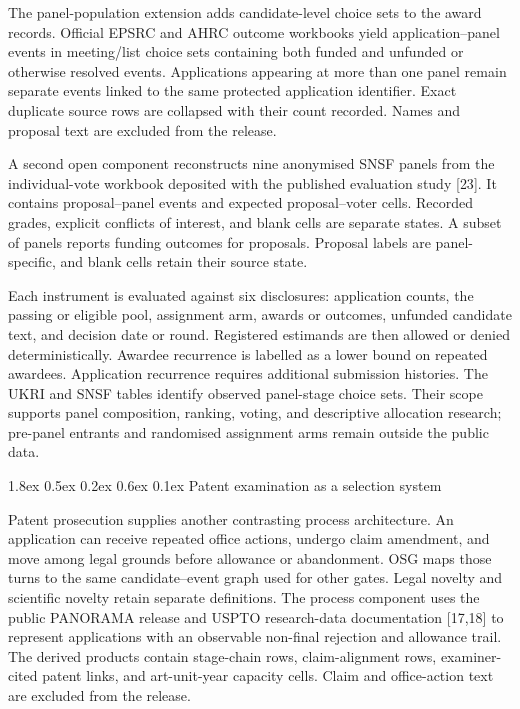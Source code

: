 \documentclass[
  10pt,
]{article}
\makeatletter
\renewcommand\subsubsection{\@startsection{subsubsection}{3}{\z@}%
  {1.8ex \@plus 0.5ex \@minus 0.2ex}%
  {0.6ex \@plus 0.1ex}%
  {\normalfont\normalsize\sffamily\bfseries\color{OSGInk}}}
\makeatother
\begin{document}
The panel-population extension adds candidate-level choice sets to the
award records. Official EPSRC and AHRC outcome workbooks yield
\OSGClaimFundingPanelApplicationEvents{} application--panel events in
\OSGClaimFundingPanelChoiceSets{} meeting/list choice
sets containing both funded and unfunded or otherwise resolved events.
Applications appearing at more than one panel remain separate events
linked to the same protected application identifier. Exact duplicate
source rows are collapsed with their count recorded. Names and proposal
text are excluded from the release.

A second open component reconstructs nine anonymised SNSF panels from
the individual-vote workbook deposited with the published evaluation
study {[}23{]}. It contains \OSGClaimSnsfProposalPanelEvents{}
proposal--panel events and \OSGClaimSnsfIndividualVoteCells{} expected
proposal--voter cells. Recorded grades, explicit conflicts of interest,
and blank cells are separate states. A subset
of panels reports funding outcomes for
\OSGClaimSnsfOutcomeObservedProposals{} proposals. Proposal labels are
panel-specific, and blank cells retain their source state.

Each instrument is evaluated against six disclosures: application
counts, the passing or eligible pool, assignment arm, awards or
outcomes, unfunded candidate text, and decision date or round.
Registered estimands are then allowed or denied deterministically.
Awardee recurrence is labelled as a lower bound on repeated awardees.
Application recurrence requires additional submission histories. The
UKRI and SNSF tables identify observed panel-stage choice sets. Their
scope supports panel composition, ranking, voting, and descriptive
allocation research; pre-panel entrants and randomised assignment arms
remain outside the public data.

\subsubsection{Patent examination as a selection system}\label{35-patent-examination}

Patent prosecution supplies another contrasting process architecture.
An application can receive repeated office actions, undergo claim
amendment, and move among legal grounds before allowance or abandonment. OSG maps
those turns to the same candidate--event graph used for other gates.
Legal novelty and scientific novelty retain separate definitions. The
process component
uses the public PANORAMA release and USPTO research-data documentation
{[}17,18{]} to represent \OSGClaimPatentPilotApplications{} applications with
an observable non-final
rejection and allowance trail.
The derived products contain \OSGClaimPatentActionChains{} stage-chain rows,
\OSGClaimPatentClaimAlignmentRows{} claim-alignment rows,
\OSGClaimPatentPriorArtLinks{} examiner-cited patent links, and
\OSGClaimPatentCapacityCells{} art-unit-year capacity cells. Claim and
office-action text are excluded from the release.
\end{document}
